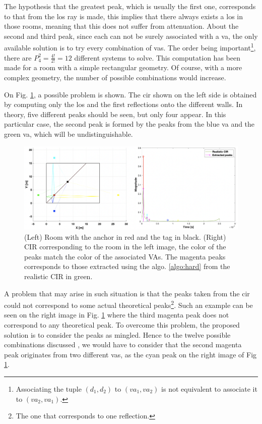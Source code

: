 The hypothesis that the greatest peak, which is usually the first one, corresponds to that from the \gls{los} ray is made, this implies that there always exists a \gls{los} in those rooms, meaning that this does not suffer from attenuation. About the second and third peak, since each can not be surely associated with a \gls{va}, the only available solution is to try every combination of \glspl{va}. The order being important\footnote{Associating the tuple $(d_1, d_2)$ to $(va_1, va_2)$ is not equivalent to associate it to $(va_2, va_1)$.}, there are $P^2_4 = \frac{4!}{2!} = 12$ different systems to solve. This computation has been made for a room with a simple rectangular geometry. Of course, with a more complex geometry, the number of possible combinations would increase.
\vspace{2mm}

On Fig. \ref{fig:va_sym}, a possible problem is shown. The \gls{cir} shown on the left side is obtained by computing only the \gls{los} and the first reflections onto the different walls. In theory, five different peaks should be seen, but only four appear. In this particular case, the second peak is formed by the peaks from the blue \gls{va} and the green \gls{va}, which will be undistinguishable.

\begin{figure}[H]
\centering
\includegraphics[width=\linewidth]{Images/antenna_combined.png}
\caption{(Left) Room with the anchor in red and the tag in black. (Right) CIR corresponding to the room in the left image, the color of the peaks match the color of the associated VAs. The magenta peaks corresponds to those extracted using the algo. \ref{algo:hard} from the realistic CIR in green. \label{fig:va_sym}}
\end{figure}

A problem that may arise in such situation is that the peaks taken from the \gls{cir} could not correspond to some actual theoretical peaks\footnote{The one that corresponds to one reflection. }. Such an example can be seen on the right image in  Fig. \ref{fig:va_sym} where the third magenta peak does not correspond to any theoretical peak. To overcome this problem, the proposed solution is to consider the peaks as mingled. Hence to the twelve possible combinations discussed , we would have to consider that the second magenta peak originates from two different \glspl{va}, as the cyan peak on the right image of Fig \ref{fig:va_sym}.
\vspace{2mm}

